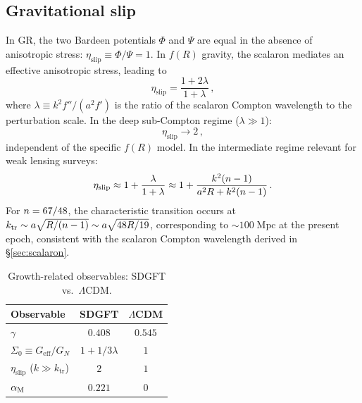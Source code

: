 \documentclass[amsmath,amssymb,aps,prd,twocolumn,superscriptaddress,nofootinbib]{revtex4-2}
\begin{document}
\subsection{Gravitational slip}

In GR, the two Bardeen potentials $\Phi$ and $\Psi$ are equal
in the absence of anisotropic stress:
$\eta_{\mathrm{slip}} \equiv \Phi/\Psi = 1$.  In $f(R)$ gravity,
the scalaron mediates an effective anisotropic stress, leading
to~\cite{Amendola2008,Pogosian2010}
\begin{equation}
  \eta_{\mathrm{slip}} = \frac{1 + 2\lambda}{1 + \lambda}\,,
  \label{eq:slip_general}
\end{equation}
where $\lambda \equiv k^2 f''/(a^2 f')$ is the ratio of the
scalaron Compton wavelength to the perturbation scale.  In the
deep sub-Compton regime ($\lambda \gg 1$):
\begin{equation}
  \eta_{\mathrm{slip}} \to 2\,,
  \label{eq:slip_subCompton}
\end{equation}
independent of the specific $f(R)$ model.  In the intermediate
regime relevant for weak lensing surveys:
\begin{equation}
  \eta_{\mathrm{slip}} \approx 1 + \frac{\lambda}{1 + \lambda}
    \approx 1 + \frac{k^2(n-1)}{a^2 R + k^2(n-1)}\,.
  \label{eq:slip_intermediate}
\end{equation}
For $n = 67/48$, the characteristic transition occurs at
$k_{\mathrm{tr}} \sim a\sqrt{R/(n-1)} \sim a\sqrt{48 R/19}$,
corresponding to $\sim 100\;\mathrm{Mpc}$ at the present epoch,
consistent with the scalaron Compton wavelength derived in
\S\ref{sec:scalaron}.

\begin{table}[t]
\centering
\caption{Growth-related observables: SDGFT vs.\ $\Lambda$CDM.}
\label{tab:growth}
\begin{tabular}{@{}lcc@{}}
\toprule
Observable & SDGFT & $\Lambda$CDM \\
\midrule
$\gamma$             & $0.408$ & $0.545$ \\
$\Sigma_0 \equiv G_{\mathrm{eff}}/G_N$ & $1 + 1/3\lambda$ & $1$ \\
$\eta_{\mathrm{slip}}$ ($k \gg k_{\mathrm{tr}}$) & $2$ & $1$ \\
$\alpha_{\mathrm{M}}$                & $0.221$ & $0$ \\
\bottomrule
\end{tabular}
\end{table}

\end{document}
